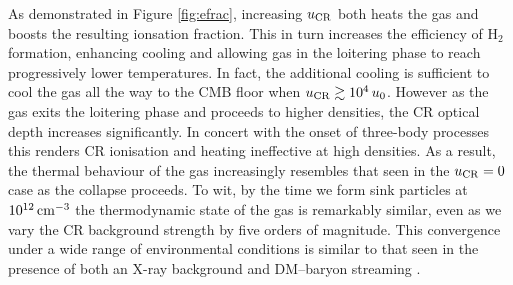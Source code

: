 \documentclass[usenatbib]{mn2e}
\newcommand{\cc}{\,{\rm cm}^{-3}}
\newcommand{\htwo}{\mathrm{H}_2}
\newcommand{\ucr}{{u}_{\rm \small CR}}
\begin{document}
As demonstrated in Figure \ref{fig:efrac}, increasing $\ucr$ both heats the gas and boosts the resulting ionsation fraction.
This in turn increases the efficiency of $\htwo$ formation, enhancing cooling and allowing gas in the loitering phase to reach progressively lower temperatures. 
In fact, the additional cooling is sufficient to cool the gas all the way to the CMB floor when $\ucr \gtrsim 10^4\,u_0$. 
However as the gas exits the loitering phase and proceeds to higher densities, the CR optical depth increases significantly. 
In concert with the onset of three-body processes this renders CR ionisation and heating ineffective at high densities. 
As a result, the thermal behaviour of the gas increasingly resembles that seen in the $\ucr=0$ case as the collapse proceeds. 
To wit, by the time we form sink particles at  $10^{12}\cc$ the thermodynamic state of the gas is remarkably similar, even as we vary the CR background strength by five orders of magnitude.
This convergence under a wide range of environmental conditions is similar to that seen in the presence of both an X-ray background \citep{Hummeletal2015} and DM--baryon streaming \citep{StacyBrommLoeb2011a,Greifetal2011b}.
\end{document}
